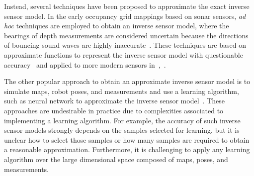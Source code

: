 \documentclass[letterpaper, 10pt, conference]{ieeeconf}
\newcommand{\EditTL}[1]{{\color{red}\protect #1}}
\begin{document}
Instead, several techniques have been proposed to approximate the exact inverse sensor model. %
In the early occupancy grid mappings based on sonar sensors, \emph{ad hoc} techniques are employed to obtain an inverse sensor model, where the bearings of depth measurements are considered uncertain because the directions of bouncing sound waves are highly inaccurate~\cite{MorElf85,Elf89}.
These techniques are based on approximate functions to represent the inverse sensor model with questionable accuracy~\cite{ChoLynHutKanBurKavThr05} and applied to more modern sensors in~\cite{And09},~\cite{PirRutBisSch11}.

The other popular approach to obtain an approximate inverse sensor model is to simulate maps, robot poses, and measurements and use a learning algorithm, such as neural network to approximate the inverse sensor model~\cite{Thr01,ThrBurFox05}. These approaches are undesirable in practice due to complexities associated to implementing a learning algorithm. For example, the accuracy of such inverse sensor models strongly depends on the samples selected for learning, but it is unclear how to select those samples or how many samples are required to obtain a reasonable approximation. Furthermore, it is challenging to apply any learning algorithm over the large dimensional space composed of maps, poses, and measurements. 




\end{document}
